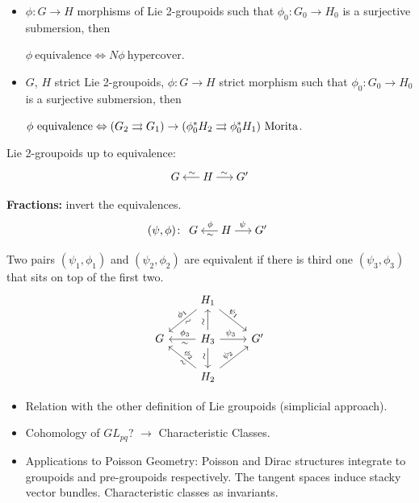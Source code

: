 \begin{thm}[dH-D]
  \begin{itemize}
    \item $\phi\colon G\to H$ morphisms of Lie 2-groupoids such that $\phi_0\colon G_0\to H_0$ is a surjective submersion, then \\
    \begin{center}\( \phi \ \text{equivalence} \Leftrightarrow N\phi \ \text{hypercover} \).\end{center}

    \item $G$, $H$ strict Lie 2-groupoids, $\phi\colon G\to H$ strict morphism such that $\phi_0\colon G_0\to H_0$ is a surjective submersion, then
    \begin{center}\( \phi \ \text{equivalence} \Leftrightarrow (G_2\tto G_1)\to (\phi_0^*H_2\tto \phi_0^*H_1) \ \text{Morita} \).\end{center}
  \end{itemize}
\end{thm}

Lie 2-groupoids up to equivalence:
\[
  \begin{tikzcd}[sep = small]
    G & H \ar[shorten = -.15em]{l}[pos=.45, above]{\sim} \ar[shorten = -.15em]{r}[pos=.45]{\sim} & G'
  \end{tikzcd}
\]

\textbf{Fractions:} invert the equivalences.
\[ (\psi, \phi)\colon
  \begin{tikzcd}[sep=small]
    G & H \ar[shorten = -.15em]{l}[pos=.45, sloped, below]{\sim}[pos=.45, sloped, above]{\phi} \ar[shorten = -.15em]{r}[pos=.45]{\psi} & G'
  \end{tikzcd}
\]

Two pairs $(\psi_1, \phi_1)$ and $(\psi_2, \phi_2)$ are equivalent if there is third one $(\psi_3, \phi_3)$ that sits on top of the first two.
\[
  \begin{tikzcd}
    & H_1 \ar{dl}[pos=.4, sloped, below]{\sim}[pos=.4, sloped, above]{\phi_1} \ar{dr}[pos=.4, sloped, above]{\psi_1} & \\
   G & H_3 \ar{l}[pos=.4, sloped, below]{\sim}[pos=.4, sloped, above]{\phi_3} \ar{u}[pos=.4, sloped, above]{\sim} \ar{r}[pos=.4, sloped, above]{\psi_3} \ar{d}[pos=.4, sloped, below]{\sim} & G' \\
    & H_2 \ar{ul}[pos=.4, sloped, above]{\phi_2}[pos=.4, sloped, below]{\sim} \ar{ur}[pos=.4, sloped, above]{\psi_2} &
  \end{tikzcd}
\]

\begin{itemize}
  \item Relation with the other definition of Lie groupoids (simplicial approach).
  \item Cohomology of $GL_{pq}$? $\rightarrow$ Characteristic Classes.
  \item Applications to Poisson Geometry:
  Poisson and Dirac structures integrate to groupoids and pre-groupoids respectively. The tangent spaces induce stacky vector bundles. Characteristic classes as invariants.
\end{itemize}
